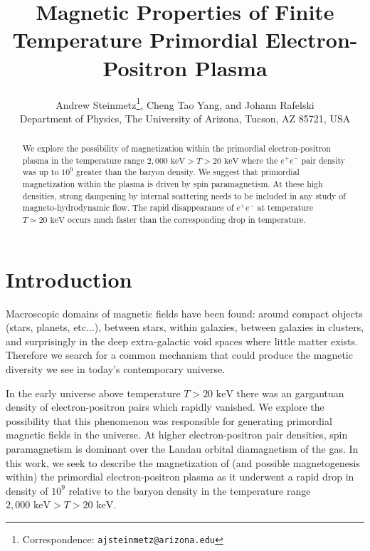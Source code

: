 \documentclass[a4paper]{article}
\title{\boldmath Magnetic Properties of Finite Temperature Primordial Electron-Positron Plasma}
\author{Andrew Steinmetz\orc{\orcC}\thanks{Correspondence: \texttt{ajsteinmetz@arizona.edu}}, Cheng Tao Yang\orc{\orcB}, and Johann Rafelski\orc{\orcA}\\ Department of Physics, The University of Arizona, Tucson, AZ 85721, USA}
\newcommand*{\keV}{\text{ keV}}
\begin{document}
\maketitle

\begin{abstract}
    We explore the possibility of magnetization within the primordial electron-positron plasma in the temperature range $2,000\keV>T>20\keV$ where the $e^{+}e^{-}$ pair density was up to $10^{9}$ greater than the baryon density. We suggest that primordial magnetization within the plasma is driven by spin paramagnetism. At these high densities, strong dampening by internal scattering needs to be included in any study of magneto-hydrodynamic flow. The rapid disappearance of $e^{+}e^{-}$ at temperature $T\simeq20\keV$ occurs much faster than the corresponding drop in temperature.
\end{abstract}


\section{Introduction}\label{sec:introduction}
\noindent Macroscopic domains of magnetic fields have been found: around compact objects (stars, planets, etc...), between stars, within galaxies, between galaxies in clusters, and surprisingly in the deep extra-galactic void spaces where little matter exists. Therefore we search for a common mechanism that could produce the magnetic diversity we see in today's contemporary universe.

In the early universe above temperature $T>20\keV$ there was an gargantuan density of electron-positron pairs which rapidly vanished. We explore the possibility that this phenomenon was responsible for generating primordial magnetic fields in the universe. At higher electron-positron pair densities, spin paramagnetism is dominant over the Landau orbital diamagnetism of the gas. In this work, we seek to describe the magnetization of (and possible magnetogenesis within) the primordial electron-positron plasma as it underwent a rapid drop in density of $10^{9}$ relative to the baryon density in the temperature range $2,000\keV>T>20\keV$.
\end{document}
